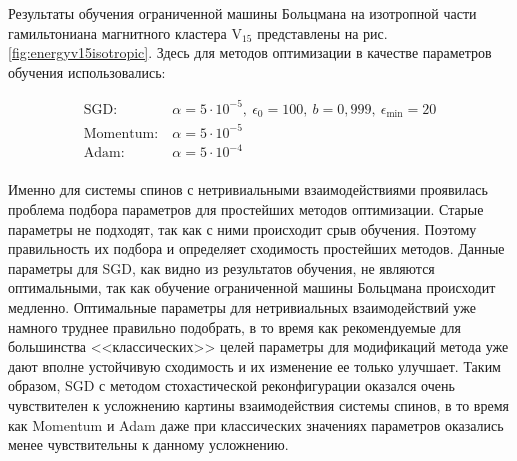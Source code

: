 Результаты обучения ограниченной машины Больцмана на изотропной части гамильтониана магнитного кластера  $\text{V}_{15}$ представлены на рис. \ref{fig:energyv15isotropic}. Здесь для методов оптимизации в качестве параметров обучения использовались:

\begin{equation*}    
\begin{split}
\text{SGD}:&\ \alpha=5\cdot 10^{-5},\ \epsilon_0=100,\ b=0,999,\ \epsilon_{\min}=20\\
\text{Momentum}:&\ \alpha=5\cdot 10^{-5}\\
\text{Adam}:&\ \alpha=5\cdot 10^{-4}\\
\end{split}
\end{equation*}

Именно для системы спинов с нетривиальными взаимодействиями проявилась проблема подбора параметров для простейших методов оптимизации.
Старые параметры не подходят, так как с ними происходит срыв обучения.
Поэтому правильность их подбора и определяет сходимость простейших методов.
Данные параметры для SGD, как видно из результатов обучения, не являются оптимальными, так как обучение ограниченной машины Больцмана происходит медленно.
Оптимальные параметры для нетривиальных взаимодействий уже намного труднее правильно подобрать, 
в то время как рекомендуемые для большинства <<классических>> целей параметры для модификаций метода уже дают вполне устойчивую сходимость и их изменение ее только улучшает.
Таким образом, SGD с методом стохастической реконфигурации оказался очень чувствителен к усложнению картины взаимодействия системы спинов, в то время как Momentum и Adam даже при классических значениях параметров оказались менее чувствительны к данному усложнению.
